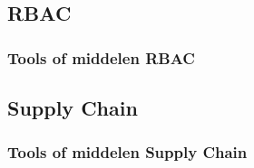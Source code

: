 \subsection{RBAC}

\subsubsection{Tools of middelen RBAC}


\subsection{Supply Chain}

\subsubsection{Tools of middelen Supply Chain}






